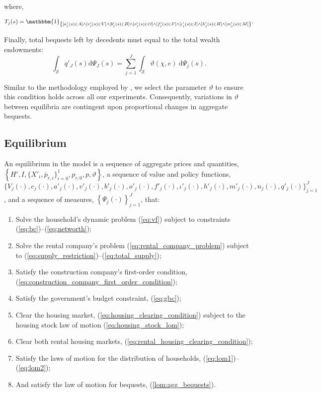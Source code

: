 \documentclass[parskip=full]{article}
\newcommand{\indicator}[1]{\mathbbm{1}_{\left\{ {#1} \right\} }}
\begin{document}
\noindent where,

\begin{align}
    T_{j}(s) = \indicator{[a'_{j}(s)\in A] \land [v'_{j}(s)\in V] \land [b'_{j}(s)\in B] \land [o'_{j}(s)\in O] \land [f'_{j}(s)\in F] \land [\iota'_{j}(s)\in I] \land [h'_{j}(s) \in H] \land [m'_{j}(s) \in M]}.\notag
\end{align}

Finally, total bequests left by decedents must equal to the total wealth endowments:
\begin{equation}\label{lom:agg_bequests}
      \int_{\mathcal{S}} q'_{J}(s) \mathrm{d}\Psi_{J}(s) =  \sum_{j=1}^J \int_{\mathcal{S}} \vartheta (\chi,e)\ \mathrm{d}\Psi_j(s).
\end{equation}

\noindent Similar to the methodology employed by \citet{kkk-2021}, we select the parameter $\vartheta$ to ensure this condition holds across all our experiments. Consequently, variations in $\vartheta$ between equilibria are contingent upon proportional changes in aggregate bequests.

\subsection{Equilibrium}
An equilibrium in the model is a sequence of aggregate prices and quantities, $\left\{H',I,\{X'_{i},\overline{p}_{r,i}\}^{1}_{i=0},p_{r,0},p,\vartheta \right\}$, a sequence of value and policy functions, $\biggl\{V_{j}(\cdot),c_{j}(\cdot),a'_{j}(\cdot),v'_{j}(\cdot),b'_{j}(\cdot),o'_{j}(\cdot),f'_{j}(\cdot),\iota'_{j}(\cdot),h'_{j}(\cdot),m'_{j}(\cdot),n_{j}(\cdot),q'_{j}(\cdot)\biggl\}_{j=1}^J$, and a sequence of measures, $\left\{\Psi_{j}(\cdot)\right\}_{j=1}^J$, that:
\begin{enumerate}
\item Solve the household's dynamic problem (\ref{eq:vf}) subject to constraints (\ref{eq:bc})--(\ref{eq:networth});
\item Solve the rental company's problem (\ref{eq:rental_company_problem}) subject to (\ref{eq:supply_restriction})--(\ref{eq:total_supply});
\item Satisfy the construction company's first-order condition, (\ref{eq:construction_company_first_order_condition});
\item Satisfy the government's budget constraint, (\ref{eq:gbc});
\item Clear the housing market,
(\ref{eq:housing_clearing_condition}) subject to the housing stock law of motion (\ref{eq:housing_stock_lom});
\item Clear both rental housing markets,
(\ref{eq:rental_housing_clearing_condition});
\item Satisfy the laws of motion for the distribution of households, (\ref{eq:lom1})--(\ref{eq:lom2});
\item And satisfy the law of motion for bequests, (\ref{lom:agg_bequests}).
\end{enumerate}
\end{document}
